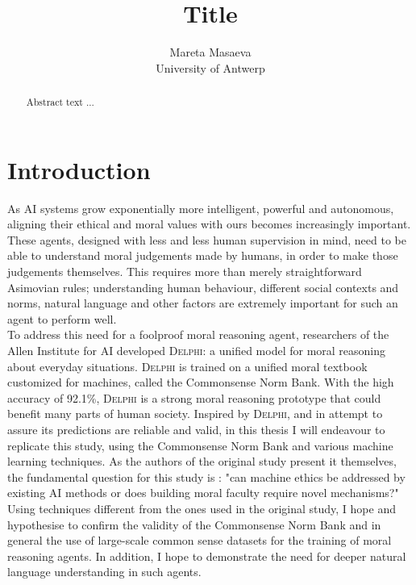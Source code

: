 \documentclass[final]{clv3} %
\title{Title}
\author{Mareta Masaeva \\ University of Antwerp}
\begin{document}




\maketitle %


\begin{abstract}

Abstract text ...

\end{abstract}

\section{Introduction} \label{sec:intro}

As AI systems grow exponentially more intelligent, powerful and autonomous, aligning their ethical and moral values with ours becomes increasingly important. These agents, designed with less and less human supervision in mind, need to be able to understand moral judgements made by humans, in order to make those judgements themselves. This requires more than merely straightforward Asimovian rules; understanding human behaviour, different social contexts and norms, natural language and other factors are extremely important for such an agent to perform well.\\

To address this need for a foolproof moral reasoning agent, researchers of the Allen Institute for AI developed \textsc{Delphi}: a unified model for moral reasoning about everyday situations. \textsc{Delphi} is trained on a unified moral textbook customized for machines, called the Commonsense Norm Bank. With the high accuracy of 92.1\%, \textsc{Delphi} is a strong moral reasoning prototype that could benefit many parts of human society. Inspired by \textsc{Delphi}, and in attempt to assure its predictions are reliable and valid, in this thesis I will endeavour to replicate this study, using the Commonsense Norm Bank and various machine learning techniques. As the authors of the original study present it themselves, the fundamental question for this study is : "can machine ethics be addressed by existing AI methods or does building moral faculty require novel mechanisms?" Using techniques different from the ones used in the original study, I hope and hypothesise to confirm the validity of the Commonsense Norm Bank and in general the use of large-scale common sense datasets for the training of moral reasoning agents. In addition, I hope to demonstrate the need for deeper natural language understanding in such agents.\\
\end{document}
